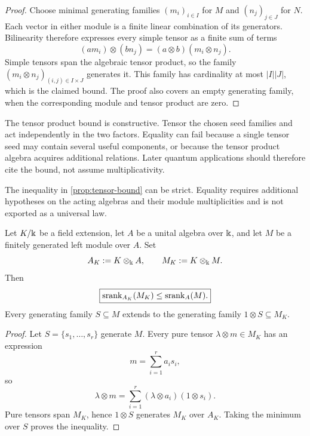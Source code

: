 \begin{proof}
Choose minimal generating families $(m_i)_{i\in I}$ for $M$ and $(n_j)_{j\in J}$ for $N$. Each vector in either module is a finite linear combination of its generators. Bilinearity therefore expresses every simple tensor as a finite sum of terms
\[
(am_i)\otimes(bn_j)=(a\otimes b)(m_i\otimes n_j).
\]
Simple tensors span the algebraic tensor product, so the family $(m_i\otimes n_j)_{(i,j)\in I\times J}$ generates it. This family has cardinality at most $|I||J|$, which is the claimed bound. The proof also covers an empty generating family, when the corresponding module and tensor product are zero.
\end{proof}

\begin{interpretation}
The tensor product bound is constructive.  Tensor the chosen seed families and act independently in the two factors.  Equality can fail because a single tensor seed may contain several useful components, or because the tensor product algebra acquires additional relations.  Later quantum applications should therefore cite the bound, not assume multiplicativity.
\end{interpretation}


\begin{boundary}
\label{bnd:tensor-nonequality}
The inequality in \cref{prop:tensor-bound} can be strict.  Equality requires additional hypotheses on the acting algebras and their module multiplicities and is not exported as a universal law.
\end{boundary}



\begin{proposition}
\label{prop:scalar-extension}
Let \(K/\Bbbk\) be a field extension, let \(A\) be a unital algebra over \(\Bbbk\), and let \(M\) be a finitely generated left module over \(A\).  Set
\[
A_K:=K\otimes_{\Bbbk}A,
\qquad
M_K:=K\otimes_{\Bbbk}M.
\]
Then
\[
\boxed{
\operatorname{srank}_{A_K}(M_K)\leq\operatorname{srank}_A(M).
}
\]
Every generating family \(S\subseteq M\) extends to the generating family \(1\otimes S\subseteq M_K\).
\end{proposition}

\begin{proof}
Let \(S=\{s_1,\ldots,s_r\}\) generate \(M\).  Every pure tensor \(\lambda\otimes m\in M_K\) has an expression
\[
m=\sum_{i=1}^r a_is_i,
\]
so
\[
\lambda\otimes m
=
\sum_{i=1}^r(\lambda\otimes a_i)(1\otimes s_i).
\]
Pure tensors span \(M_K\), hence \(1\otimes S\) generates \(M_K\) over \(A_K\).  Taking the minimum over \(S\) proves the inequality.
\end{proof}

